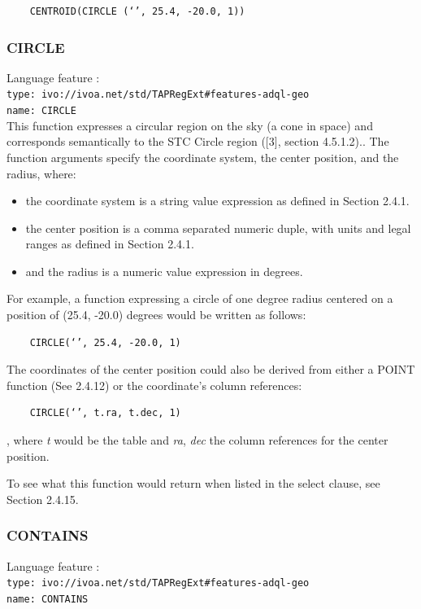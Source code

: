 \documentclass[11pt,a4paper]{ivoa}
\begin{document}
\begin{verbatim}
    CENTROID(CIRCLE (‘’, 25.4, -20.0, 1))
\end{verbatim}

\subsubsection{CIRCLE}
\label{sec:geom.functions.circle}
{\footnotesize Language feature :}\\
{\footnotesize \verb|type: ivo://ivoa.net/std/TAPRegExt#features-adql-geo|}\\
{\footnotesize \verb|name: CIRCLE|}\\

This function expresses a circular region on the sky (a cone in space) and
corresponds semantically to the STC Circle region ([3], section 4.5.1.2).. The
function arguments specify the coordinate system, the center position,
and the radius, where:

\begin{itemize}
    \item the coordinate system is a string value expression as defined in Section 2.4.1.
    \item the center position is a comma separated numeric duple, with units and legal ranges as defined in Section 2.4.1.
    \item and the radius is a numeric value expression in degrees.
\end{itemize}

For example, a function expressing a circle of one degree radius centered on a
position of (25.4, -20.0) degrees would be written as follows:

\begin{verbatim}
    CIRCLE(‘’, 25.4, -20.0, 1)
\end{verbatim}

The coordinates of the center position could also be derived from either a
POINT function (See 2.4.12) or the coordinate’s column references:

\begin{verbatim}
    CIRCLE(‘’, t.ra, t.dec, 1)
\end{verbatim}

, where \textit{t} would be the table and \textit{ra}, \textit{dec} the
column references for the center position.

To see what this function would return when listed in the select clause, see
Section 2.4.15.

\subsubsection{CONTAINS}
\label{sec:geom.functions.contains}
{\footnotesize Language feature :}\\
{\footnotesize \verb|type: ivo://ivoa.net/std/TAPRegExt#features-adql-geo|}\\
{\footnotesize \verb|name: CONTAINS|}\\
\end{document}
